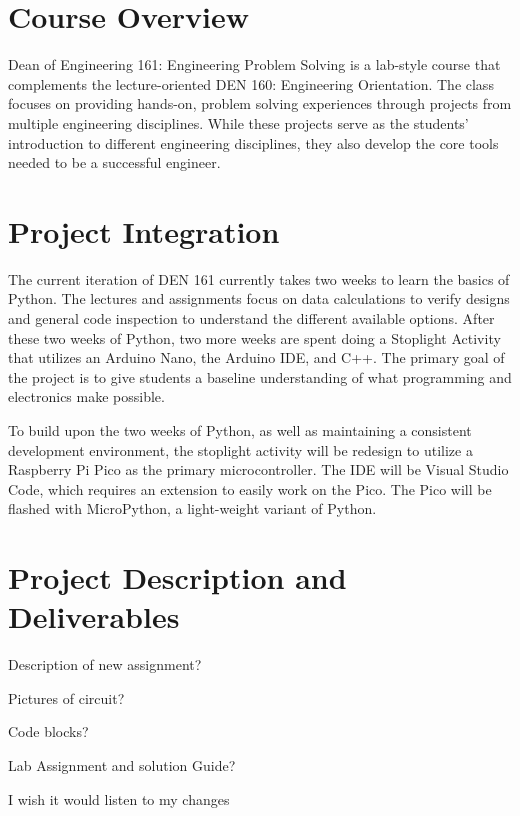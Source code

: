 \section{Course Overview}
Dean of Engineering 161: Engineering Problem Solving is a lab-style
course that complements the lecture-oriented DEN 160: Engineering
Orientation. The class focuses on providing hands-on, problem
solving experiences through projects from multiple engineering 
disciplines. While these projects serve as the students' introduction
to different engineering disciplines, they also develop the core 
tools needed to be a successful engineer. 

\section{Project Integration}
The current iteration of DEN 161 currently takes two weeks to learn the 
basics of Python. The lectures and assignments focus on data
calculations to verify designs and general code inspection to 
understand the different available options. After these two weeks 
of Python, two more weeks are spent doing a Stoplight Activity that 
utilizes an Arduino Nano, the Arduino IDE, and C++. The primary goal 
of the project is to give students a baseline understanding of what 
programming and electronics make possible.



To build upon the two weeks of Python, as well as maintaining a 
consistent development environment, the stoplight activity will be 
redesign to utilize a Raspberry Pi Pico as the primary microcontroller. The IDE will be Visual Studio Code, which requires an extension to easily work on the Pico. The Pico will be flashed with MicroPython, a light-weight variant of Python.

\section{Project Description and Deliverables}
Description of new assignment?

Pictures of circuit?

Code blocks?

Lab Assignment and solution Guide?

I wish it would listen to my changes